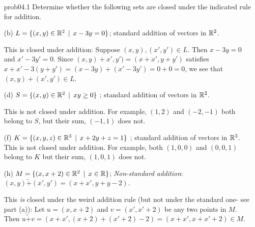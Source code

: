 
\begin{sol}{prob04.1} Determine whether   the following sets are closed under the indicated rule for addition. 

  

\medskip


(b)  $L=\{(x, y) \in \mathbb{R}^2\,\mid \, x -3y=0  \}$; standard addition of vectors in $\mathbb{R}^2$. 

\soln This is closed under addition: Suppose $(x,y), (x',y')\in L$. Then $x -3y=0$ and $x' -3y'=0$. Since $(x,y)+ x',y')=(x+x', y+y')$ satisfies $x+x' -3(y+y')= (x -3y) +(x' -3y')=0+0=0$, we see that  $(x,y)+ (x',y')\in L$.\medskip
%
 

(d) $S=\{(x, y) \in \mathbb{R}^2\,\mid \, xy \ge 0  \}$ ; standard addition of vectors in $\mathbb{R}^2$. 

\soln This is not closed under addition. For example, $(1,2)$ and $(-2,-1)$ both belong to $S$, but their sum, $(-1,1)$ does not.\medskip


(f)  $K=\{(x, y, z) \in \mathbb{R}^3\,\mid \, x+2y+z=1  \}$ ; standard addition of vectors in $\mathbb{R}^3$. \soln This is not closed under addition. For example, both $(1,0,0)$ and $(0,0,1)$ belong to $K$ but their sum, $(1,0,1)$ does not.  \medskip 
%

 


(h)  $M=\{(x, x+2) \in \mathbb{R}^2\,\mid \, x\in \mathbb{R} \}$; {\it Non-standard addition}: $(x,y) \tilde+ (x',y')=(x+x', y+y-2)$.  

\soln  This {\it is }closed under the weird addition rule (but not under the standard one- see part (a)): Let $u=(x, x+2)$ and $v=(x', x'+2)$ be any two points in $M$. Then $u \tilde+ v=(x+x', (x+2)+(x'+2)-2)=(x+x', x+x'+2) \in M$.\medskip

\end{sol} 

